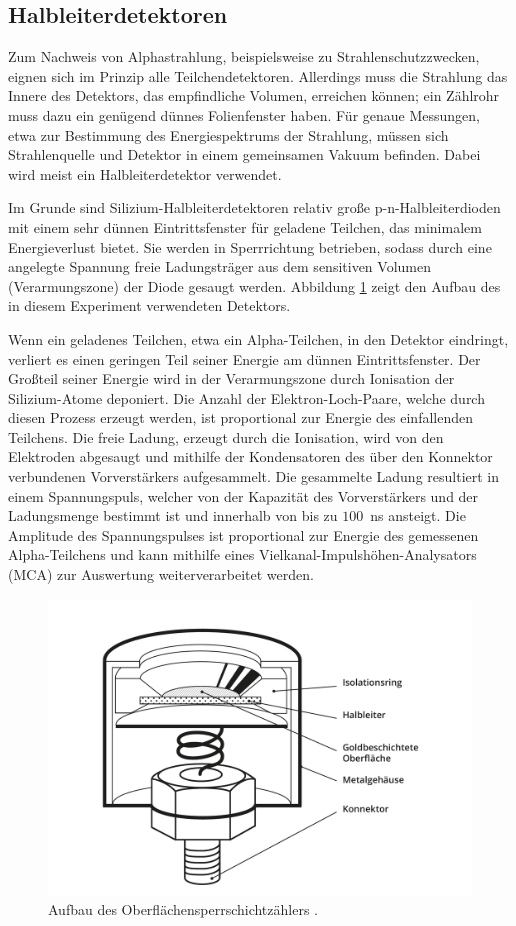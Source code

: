 \subsection{Halbleiterdetektoren}
Zum Nachweis von Alphastrahlung, beispielsweise zu Strahlenschutzzwecken, eignen sich im Prinzip alle Teilchendetektoren. Allerdings muss die Strahlung das Innere des Detektors, das empfindliche Volumen, erreichen können; ein Zählrohr muss dazu ein genügend dünnes Folienfenster haben. Für genaue Messungen, etwa zur Bestimmung des Energiespektrums der Strahlung, müssen sich Strahlenquelle und Detektor in einem gemeinsamen Vakuum befinden. Dabei wird meist ein Halbleiterdetektor verwendet. \cite{dewiki:240085809}

Im Grunde sind Silizium-Halbleiterdetektoren relativ große p-n-Halbleiterdioden mit einem sehr dünnen Eintrittsfenster für geladene Teilchen, das minimalem Energieverlust bietet. Sie werden in Sperrrichtung betrieben, sodass durch eine angelegte Spannung freie Ladungsträger aus dem sensitiven Volumen (Verarmungszone) der Diode gesaugt werden. Abbildung \ref{fig:surfacebarrier} zeigt den Aufbau des in diesem Experiment verwendeten Detektors. 

Wenn ein geladenes Teilchen, etwa ein Alpha-Teilchen, in den Detektor eindringt, verliert es einen geringen Teil seiner Energie am dünnen Eintrittsfenster. Der Großteil seiner Energie wird in der Verarmungszone durch Ionisation der Silizium-Atome deponiert. Die Anzahl der Elektron-Loch-Paare, welche durch diesen Prozess erzeugt werden, ist proportional zur Energie des einfallenden Teilchens. Die freie Ladung, erzeugt durch die Ionisation, wird von den Elektroden abgesaugt und mithilfe der Kondensatoren des über den Konnektor verbundenen Vorverstärkers aufgesammelt. Die gesammelte Ladung resultiert in einem Spannungspuls, welcher von der Kapazität des Vorverstärkers und der Ladungsmenge bestimmt ist und innerhalb von bis zu $100$~ns ansteigt. Die Amplitude des Spannungspulses ist proportional zur Energie des gemessenen Alpha-Teilchens und kann mithilfe eines Vielkanal-Impulshöhen-Analysators (MCA) zur Auswertung weiterverarbeitet werden.

\begin{figure}[h]
	\centering
	\includegraphics[width=0.7\linewidth]{img/surface_barrier}
	\caption{Aufbau des Oberflächensperrschichtzählers \cite{leo}.}
	\label{fig:surfacebarrier}
\end{figure}

